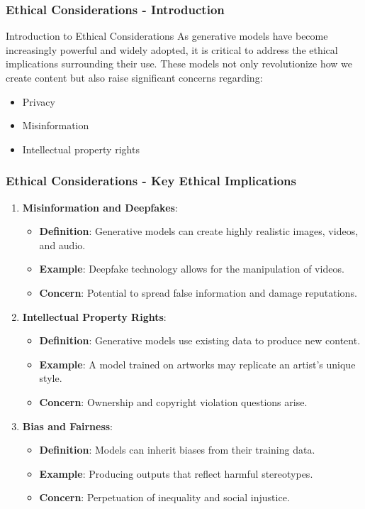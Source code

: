 \documentclass[aspectratio=169]{beamer}
\begin{document}
\begin{frame}[fragile]
    \frametitle{Ethical Considerations - Introduction}
    \begin{block}{Introduction to Ethical Considerations}
        As generative models have become increasingly powerful and widely adopted, it is critical to address the ethical implications surrounding their use. These models not only revolutionize how we create content but also raise significant concerns regarding:
        \begin{itemize}
            \item Privacy
            \item Misinformation
            \item Intellectual property rights
        \end{itemize}
    \end{block}
\end{frame}

\begin{frame}[fragile]
    \frametitle{Ethical Considerations - Key Ethical Implications}
    \begin{enumerate}
        \item \textbf{Misinformation and Deepfakes}:
            \begin{itemize}
                \item \textbf{Definition}: Generative models can create highly realistic images, videos, and audio.
                \item \textbf{Example}: Deepfake technology allows for the manipulation of videos.
                \item \textbf{Concern}: Potential to spread false information and damage reputations.
            \end{itemize}
        
        \item \textbf{Intellectual Property Rights}:
            \begin{itemize}
                \item \textbf{Definition}: Generative models use existing data to produce new content.
                \item \textbf{Example}: A model trained on artworks may replicate an artist’s unique style.
                \item \textbf{Concern}: Ownership and copyright violation questions arise.
            \end{itemize}
        
        \item \textbf{Bias and Fairness}:
            \begin{itemize}
                \item \textbf{Definition}: Models can inherit biases from their training data.
                \item \textbf{Example}: Producing outputs that reflect harmful stereotypes.
                \item \textbf{Concern}: Perpetuation of inequality and social injustice.
            \end{itemize}
    \end{enumerate}
\end{frame}
\end{document}
